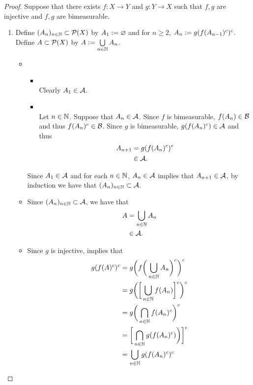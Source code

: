 \documentclass{book}
\begin{document}
	\begin{proof}
		Suppose that there exists $f:X \rightarrow Y$ and $g: Y \rightarrow X$ such that $f,g$ are injective and $f,g$ are bimeasurable. 
		\begin{enumerate}
			\item Define $(A_n)_{n \in \mathbb{N}} \subset \mathcal{P}(X)$ by $A_1 \vcentcolon= \varnothing$ and for $n \geq 2$, $A_n \vcentcolon= g(f(A_{n-1})^c)^c$. Define $A \subset \mathcal{P}(X)$ by $A \vcentcolon= \bigcup\limits_{n \in \mathbb{N}} A_n$. 
			\begin{itemize}
				\item 
				\begin{itemize}
					\item {} \\
					Clearly $A_1 \in \mathcal{A}$. 
					\item {} \\
					Let $n \in \mathbb{N}$. Suppose that $A_n \in \mathcal{A}$. Since $f$ is bimeasurable, $f(A_n) \in \mathcal{B}$ and thus $f(A_n)^c \in \mathcal{B}$. Since $g$ is bimeasurable, $g(f(A_n)^c) \in \mathcal{A}$ and thus 
					\begin{align*}
						A_{n+1}
						& = g(f(A_n)^c)^c \\
						& \in \mathcal{A}.
					\end{align*} 
				\end{itemize}
				Since $A_1 \in \mathcal{A}$ and for each $n \in \mathbb{N}$, $A_n \in \mathcal{A}$ implies that $A_{n+1} \in \mathcal{A}$, by induction we have that $(A_n)_{n \in \mathbb{N}} \subset \mathcal{A}$. 
				\item Since $(A_n)_{n \in \mathbb{N}} \subset \mathcal{A}$, we have that 
				\begin{align*}
					A
					& = \bigcup_{n \in \mathbb{N}} A_n \\
					& \in \mathcal{A}. 
				\end{align*}
				\item Since $g$ is injective,  implies that 
				\begin{align*}
					g(f(A)^c)^c
					& = g \bigg( f \bigg( \bigcup\limits_{n \in \N} A_n \bigg)^c \bigg)^c \\
					& = g \bigg( \bigg[ \bigcup\limits_{n \in \N} f(A_n) \bigg]^c \bigg)^c \\
					& = g\bigg( \bigcap\limits_{n \in \N} f(A_n)^c  \bigg)^c \\
					& = \bigg[ \bigcap\limits_{n \in \N} g(f(A_n)^c)  \bigg) \bigg]^c \\
					& = \bigcup\limits_{n \in \N} g(f(A_n)^c)^c \\

\end{align*}
\end{itemize}
\end{enumerate}
\end{proof}
\end{document}
